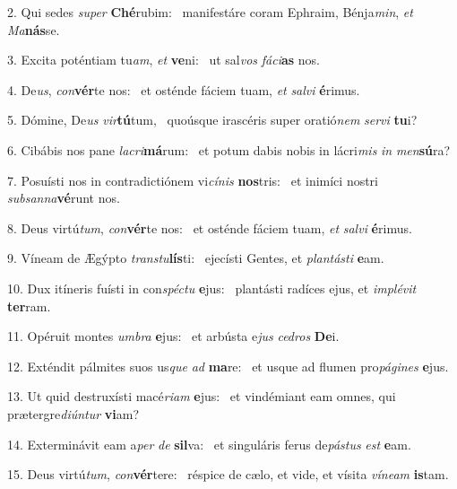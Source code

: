 2. Qui sedes \textit{su}\textit{per} \textbf{Ché}rubim: \ast\  manifestáre coram Ephraim, Bénja\textit{min}, \textit{et} \textit{Ma}\textbf{nás}se.\

3. Excita poténtiam tu\textit{am}, \textit{et} \textbf{ve}ni: \ast\  ut sal\textit{vos} \textit{fá}\textit{ci}\textbf{as} nos.\

4. De\textit{us}, \textit{con}\textbf{vér}te nos: \ast\  et osténde fáciem tuam, \textit{et} \textit{sal}\textit{vi} \textbf{é}rimus.\

5. Dómine, De\textit{us} \textit{vir}\textbf{tú}tum, \ast\  quoúsque irascéris super oratió\textit{nem} \textit{ser}\textit{vi} \textbf{tu}i?\

6. Cibábis nos pane \textit{la}\textit{cri}\textbf{má}rum: \ast\  et potum dabis nobis in lácri\textit{mis} \textit{in} \textit{men}\textbf{sú}ra?\

7. Posuísti nos in contradictiónem vi\textit{cí}\textit{nis} \textbf{nos}tris: \ast\  et inimíci nostri \textit{sub}\textit{san}\textit{na}\textbf{vé}runt nos.\

8. Deus virtú\textit{tum}, \textit{con}\textbf{vér}te nos: \ast\  et osténde fáciem tuam, \textit{et} \textit{sal}\textit{vi} \textbf{é}rimus.\

9. Víneam de Ægýpto \textit{trans}\textit{tu}\textbf{lís}ti: \ast\  ejecísti Gentes, et \textit{plan}\textit{tás}\textit{ti} \textbf{e}am.\

10. Dux itíneris fuísti in con\textit{spéc}\textit{tu} \textbf{e}jus: \ast\  plantásti radíces ejus, et \textit{im}\textit{plé}\textit{vit} \textbf{ter}ram.\

11. Opéruit montes \textit{um}\textit{bra} \textbf{e}jus: \ast\  et arbústa e\textit{jus} \textit{ce}\textit{dros} \textbf{De}i.\

12. Exténdit pálmites suos us\textit{que} \textit{ad} \textbf{ma}re: \ast\  et usque ad flumen pro\textit{pá}\textit{gi}\textit{nes} \textbf{e}jus.\

13. Ut quid destruxísti macé\textit{ri}\textit{am} \textbf{e}jus: \ast\  et vindémiant eam omnes, qui prætergre\textit{di}\textit{ún}\textit{tur} \textbf{vi}am?\

14. Exterminávit eam a\textit{per} \textit{de} \textbf{sil}va: \ast\  et singuláris ferus de\textit{pás}\textit{tus} \textit{est} \textbf{e}am.\

15. Deus virtú\textit{tum}, \textit{con}\textbf{vér}tere: \ast\  réspice de cælo, et vide, et vísita \textit{ví}\textit{ne}\textit{am} \textbf{is}tam.\

